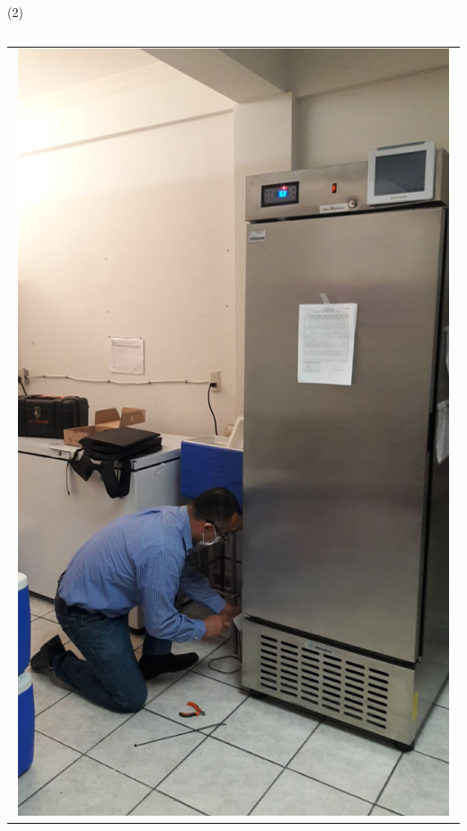 \begin{frame}{ (2)}
\begin{columns}
\begin{column}{0.2\textwidth}
\begin{center}
\begin{tabular}{c}
         \includegraphics[width=0.98\textwidth]{2022_RefrigeradoresFrios/figs/RefrisSST}\\
          \end{tabular}
\end{center}
\end{column} 
\end{columns} 
\end{frame}




